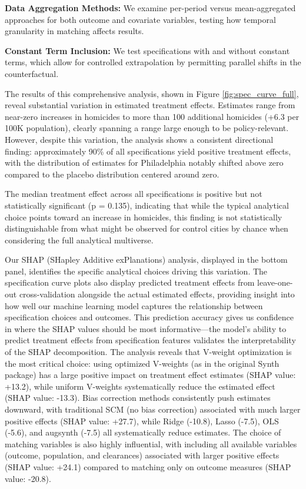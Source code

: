 \textbf{Data Aggregation Methods:} We examine per-period versus mean-aggregated approaches for both outcome and covariate variables, testing how temporal granularity in matching affects results.

\textbf{Constant Term Inclusion:} We test specifications with and without constant terms, which allow for controlled extrapolation by permitting parallel shifts in the counterfactual.

The results of this comprehensive analysis, shown in Figure \ref{fig:spec_curve_full}, reveal substantial variation in estimated treatment effects. Estimates range from near-zero increases in homicides to more than 100 additional homicides (+6.3 per 100K population), clearly spanning a range large enough to be policy-relevant. However, despite this variation, the analysis shows a consistent directional finding: approximately 90\% of all specifications yield positive treatment effects, with the distribution of estimates for Philadelphia notably shifted above zero compared to the placebo distribution centered around zero.

The median treatment effect across all specifications is positive but not statistically significant (p = 0.135), indicating that while the typical analytical choice points toward an increase in homicides, this finding is not statistically distinguishable from what might be observed for control cities by chance when considering the full analytical multiverse.

Our SHAP (SHapley Additive exPlanations) analysis, displayed in the bottom panel, identifies the specific analytical choices driving this variation. The specification curve plots also display predicted treatment effects from leave-one-out cross-validation alongside the actual estimated effects, providing insight into how well our machine learning model captures the relationship between specification choices and outcomes. This prediction accuracy gives us confidence in where the SHAP values should be most informative—the model's ability to predict treatment effects from specification features validates the interpretability of the SHAP decomposition. The analysis reveals that V-weight optimization is the most critical choice: using optimized V-weights (as in the original Synth package) has a large positive impact on treatment effect estimates (SHAP value: +13.2), while uniform V-weights systematically reduce the estimated effect (SHAP value: -13.3). Bias correction methods consistently push estimates downward, with traditional SCM (no bias correction) associated with much larger positive effects (SHAP value: +27.7), while Ridge (-10.8), Lasso (-7.5), OLS (-5.6), and augsynth (-7.5) all systematically reduce estimates. The choice of matching variables is also highly influential, with including all available variables (outcome, population, and clearances) associated with larger positive effects (SHAP value: +24.1) compared to matching only on outcome measures (SHAP value: -20.8).

